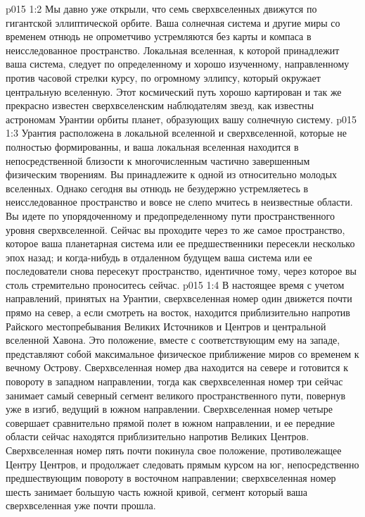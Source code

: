 \vs p015 1:2 Мы давно уже открыли, что семь сверхвселенных движутся по гигантской эллиптической орбите. Ваша солнечная система и другие миры со временем отнюдь не опрометчиво устремляются без карты и компаса в неисследованное пространство. Локальная вселенная, к которой принадлежит ваша система, следует по определенному и хорошо изученному, направленному против часовой стрелки курсу, по огромному эллипсу, который окружает центральную вселенную. Этот космический путь хорошо картирован и так же прекрасно известен сверхвселенским наблюдателям звезд, как известны астрономам Урантии орбиты планет, образующих вашу солнечную систему.
\vs p015 1:3 Урантия расположена в локальной вселенной и сверхвселенной, которые не полностью формированны, и ваша локальная вселенная находится в непосредственной близости к многочисленным частично завершенным физическим творениям. Вы принадлежите к одной из относительно молодых вселенных. Однако сегодня вы отнюдь не безудержно устремляетесь в неисследованное пространство и вовсе не слепо мчитесь в неизвестные области. Вы идете по упорядоченному и предопределенному пути пространственного уровня сверхвселенной. Сейчас вы проходите через то же самое пространство, которое ваша планетарная система или ее предшественники пересекли несколько эпох назад; и когда\hyp{}нибудь в отдаленном будущем ваша система или ее последователи снова пересекут пространство, идентичное тому, через которое вы столь стремительно проноситесь сейчас.
\vs p015 1:4 \pc В настоящее время с учетом направлений, принятых на Урантии, сверхвселенная номер один движется почти прямо на север, а если смотреть на восток, находится приблизительно напротив Райского местопребывания Великих Источников и Центров и центральной вселенной Хавона. Это положение, вместе с соответствующим ему на западе, представляют собой максимальное физическое приближение миров со временем к вечному Острову. Сверхвселенная номер два находится на севере и готовится к повороту в западном направлении, тогда как сверхвселенная номер три сейчас занимает самый северный сегмент великого пространственного пути, повернув уже в изгиб, ведущий в южном направлении. Сверхвселенная номер четыре совершает сравнительно прямой полет в южном направлении, и ее передние области сейчас находятся приблизительно напротив Великих Центров. Сверхвселенная номер пять почти покинула свое положение, противолежащее Центру Центров, и продолжает следовать прямым курсом на юг, непосредственно предшествующим повороту в восточном направлении; сверхвселенная номер шесть занимает большую часть южной кривой, сегмент который ваша сверхвселенная уже почти прошла.
